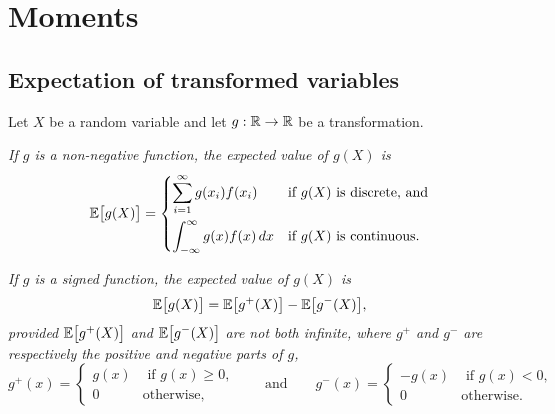 
\section{Moments}\label{sec:moments}

\subsection{Expectation of transformed variables}\label{sec:expe_transformed}

Let $X$ be a random variable and let $g:\mathbb{R}\to\mathbb{R}$ be a transformation. 

\ben
\it If $g$ is a \emph{non-negative} function, the expected value of $g(X)$ is
\[
\mathbb{E}\big[g(X)\big] = \begin{cases}
	\displaystyle\sum_{i=1}^{\infty} g(x_i)f(x_i)		& \text{if $g(X)$ is discrete, and} \\[3ex]
	\displaystyle\int_{-\infty}^{\infty} g(x)f(x)\,dx	& \text{if $g(X)$ is continuous.} 
\end{cases}
\]

\it If $g$ is a \emph{signed function}, the expected value of $g(X)$ is
\[
\mathbb{E}\big[g(X)\big] = \mathbb{E}\big[g^{+}(X)\big] - \mathbb{E}\big[g^{-}(X)\big],
\]
provided $\mathbb{E}\big[g^{+}(X)\big]$ and $\mathbb{E}\big[g^{-}(X)\big]$ are not both infinite, where $g^{+}$ and $g^{-}$ are respectively the positive and negative parts of $g$, 
\[
g^{+}(x)	= \begin{cases}  g(x) & \text{ if } g(x)\geq 0, \\ 0 & \text{otherwise,}\end{cases}
\qquad\text{and}\qquad
g^{-}(x)	= \begin{cases} -g(x) & \text{ if } g(x)<0, \\ 0 & \text{otherwise.}\end{cases}
\]
\een

